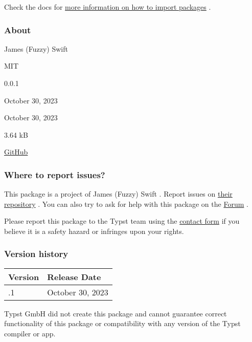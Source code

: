 

Check the docs for
\href{https://typst.app/docs/reference/scripting/\#packages}{more
information on how to import packages} .

\subsubsection{About}\label{about}

\begin{description}
\tightlist
\item[Author :]
James (Fuzzy) Swift
\item[License:]
MIT
\item[Current version:]
0.0.1
\item[Last updated:]
October 30, 2023
\item[First released:]
October 30, 2023
\item[Archive size:]
3.64 kB
\href{https://packages.typst.org/preview/chem-par-0.0.1.tar.gz}{\pandocbounded{}}
\item[Repository:]
\href{https://github.com/JamesxX/typst-chem-par}{GitHub}
\end{description}

\subsubsection{Where to report issues?}\label{where-to-report-issues}

This package is a project of James (Fuzzy) Swift . Report issues on
\href{https://github.com/JamesxX/typst-chem-par}{their repository} . You
can also try to ask for help with this package on the
\href{https://forum.typst.app}{Forum} .

Please report this package to the Typst team using the
\href{https://typst.app/contact}{contact form} if you believe it is a
safety hazard or infringes upon your rights.

\label{versions}
\subsubsection{Version history}\label{version-history}

\begin{longtable}[]{@{}ll@{}}
\toprule\noalign{}
Version & Release Date \\
\midrule\noalign{}
\endhead
\bottomrule\noalign{}
\endlastfoot
0.0.1 & October 30, 2023 \\
\end{longtable}

Typst GmbH did not create this package and cannot guarantee correct
functionality of this package or compatibility with any version of the
Typst compiler or app.
